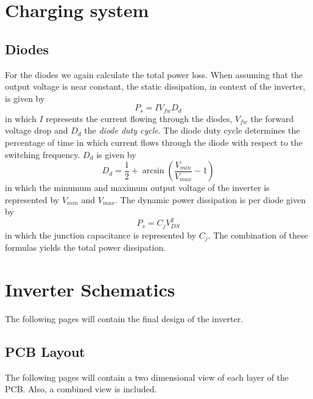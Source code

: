 \documentclass[11pt,titlepage]{report}
\begin{document}
\begin{appendices}
\renewcommand{\chapternumber}{\appendixname\space\thechapter}

\chapter{Charging system}
\label{app:chargingsystem}

\section{Diodes}
For the diodes we again calculate the total power loss. When assuming that the output voltage is near constant, the static dissipation, in context of the inverter, is given by
\begin{equation}
\label{eq:ass1-diode-static-power}
	P_s = I V_{fw} D_{d}
\end{equation}
in which $I$ represents the current flowing through the diodes, $V_{fw}$ the forward voltage drop and $D_{d}$ the \textit{diode duty cycle}. The diode duty cycle determines the percentage of time in which current flows through the diode with respect to the switching frequency. $D_{d}$ is given by
\begin{equation}
\label{eq:ass1-diode-dutycycle}
	D_d = \frac{1}{2}+\arcsin{ \left( \frac{V_{min}}{V_{max}}-1 \right) }
\end{equation}
in which the minumum and maximum output voltage of the inverter is represented by $V_{min}$ and $V_{max}$. The dynamic power dissipation is per diode given by
\begin{equation}
\label{eq:ass1-diode-dynamic-power}
	P_s = C_j V_{DS}^2
\end{equation}
in which the junction capacitance is represented by $C_j$. The combination of these formulas yields the total power dissipation.

\chapter{Inverter Schematics}
\label{app:schematics}
The following pages will contain the final design of the inverter.

\section{PCB Layout}
\label{app:pcb_layout}
The following pages will contain a two dimensional view of each layer of the PCB. Also, a combined view is included.


\end{appendices}
\end{document}
